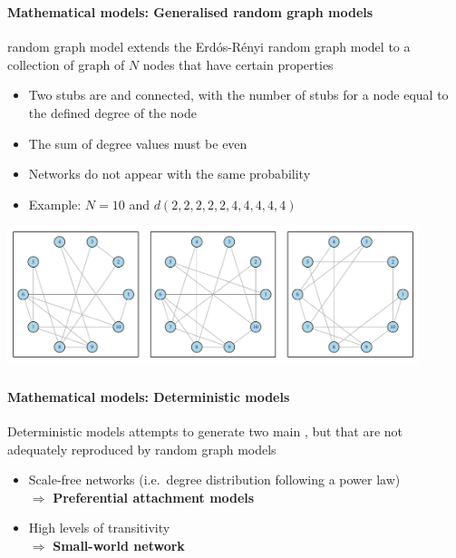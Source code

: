 \documentclass[8pt]{beamer}
\begin{document}

\begin{frame}
\frametitle{\insertsection}
\framesubtitle{Mathematical models: Generalised random graph models}

{\color{blue}{Generalised}} random graph model extends the Erd\'os-R\'enyi random graph model to a collection of graph of $N$ nodes that have certain properties
\begin{itemize}
	\item Two stubs are {\color{blue}{chosen uniformly at random}} and connected, with the number of stubs for a node equal to the defined degree of the node
	\item The sum of degree values must be even
	\item Networks do not appear with the same probability
	\item Example: $N=10$ and $d(2,2,2,2,2,4,4,4,4,4)$
\end{itemize}
	
\medskip

\centering
\includegraphics[width=0.9\textwidth]{generalised}

\end{frame}


\begin{frame}
\frametitle{\insertsection}
\framesubtitle{Mathematical models: Deterministic models}

Deterministic models attempts to generate two main {\color{blue}{characteristics that are observed in real networks}}, but that are not adequately reproduced by random graph models
\begin{itemize}
	\item Scale-free networks (i.e.\ degree distribution following a power law) \\ 
		  $\Rightarrow$ \textbf{Preferential attachment models}
	\item High levels of transitivity \\
		  $\Rightarrow$ \textbf{Small-world network}
\end{itemize}

\end{frame}
\end{document}
